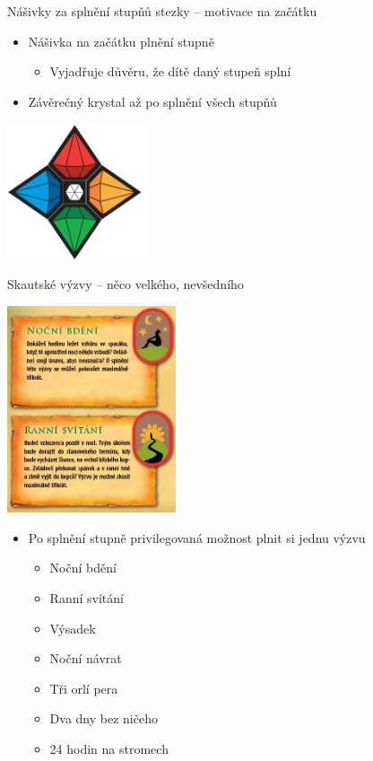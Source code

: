 \documentclass[compress,xelatex,xcolor=dvipsnames,print]{beamer}
\begin{document}
\begin{frame}{Nášivky za splnění stupňů stezky -- motivace na začátku}
\begin{itemize}
\item Nášivka na začátku plnění stupně
 \begin{itemize}
 \item Vyjadřuje důvěru, že dítě daný stupeň splní
 \end{itemize}
\item Závěrečný krystal až po splnění všech stupňů
\end{itemize}
\begin{center}
\includegraphics[height=4cm]{kameny.png}
\end{center}
\end{frame}

\begin{frame}{Skautské výzvy -- něco velkého, nevšedního}
\begin{multicols}{2}
\includegraphics[height=6.1cm]{vyzvy.png}
\begin{itemize}
\item Po splnění stupně privilegovaná možnost plnit si jednu výzvu
 \begin{itemize}
 \item Noční bdění
 \item Ranní svítání
 \item Výsadek
 \item Noční návrat
 \item Tři orlí pera
 \item Dva dny bez ničeho
 \item 24 hodin na stromech
 \end{itemize}
\end{itemize}
\end{multicols}
\end{frame}
\end{document}
